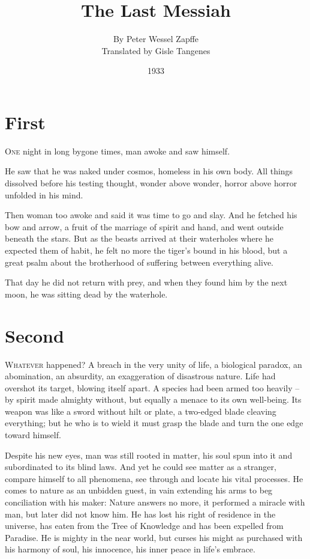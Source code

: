 \documentclass[draft,a4paper,10pt,twocolumn]{article}
\title{The Last Messiah}
\author{By Peter Wessel Zapffe\\
Translated by Gisle Tangenes}
\date{1933}
\begin{document}
\maketitle

\section{First}
\lettrine[lines=2]{O}{ne} night in long bygone times, man awoke and saw himself.

He saw that he was naked under cosmos, homeless in his own body. All things dissolved before his testing thought, wonder above wonder, horror above horror unfolded in his mind.

Then woman too awoke and said it was time to go and slay. And he fetched his bow and arrow, a fruit of the marriage of spirit and hand, and went outside beneath the stars. But as the beasts arrived at their waterholes where he expected them of habit, he felt no more the tiger's bound in his blood, but a great psalm about the brotherhood of suffering between everything alive.

That day he did not return with prey, and when they found him by the next moon, he was sitting dead by the waterhole.

\section{Second}

\lettrine[lines=2]{W}{hatever} happened? A breach in the very unity of life, a biological paradox, an abomination, an absurdity, an exaggeration of disastrous nature. Life had overshot its target, blowing itself apart. A species had been armed too heavily -- by spirit made almighty without, but equally a menace to its own well-being. Its weapon was like a sword without hilt or plate, a two-edged blade cleaving everything; but he who is to wield it must grasp the blade and turn the one edge toward himself.

Despite his new eyes, man was still rooted in matter, his soul spun into it and subordinated to its blind laws. And yet he could see matter as a stranger, compare himself to all phenomena, see through and locate his vital processes. He comes to nature as an unbidden guest, in vain extending his arms to beg conciliation with his maker: Nature answers no more, it performed a miracle with man, but later did not know him. He has lost his right of residence in the universe, has eaten from the Tree of Knowledge and has been expelled from Paradise. He is mighty in the near world, but curses his might as purchased with his harmony of soul, his innocence, his inner peace in life's embrace.
\end{document}
